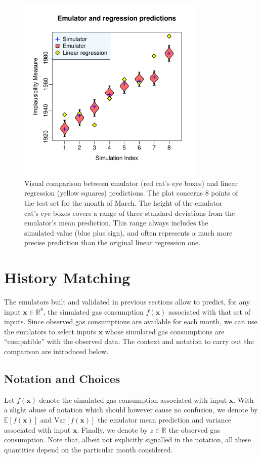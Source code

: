 \documentclass[a4paper, 12pt]{article}
\newcommand{\R}{\mathbb{R}}
\newcommand{\bd}[1]{\boldsymbol{#1}}
\newcommand{\x}{\bd x}
\newcommand{\E}{\mathbb{E}}
\newcommand{\Var}{\text{Var}}
\begin{document}
\begin{figure}
\centering
 \includegraphics[width=0.8\textwidth]{Validation_Plots/Comparison_LR/LR_Mar_82-89}
 \caption{Visual comparison between emulator (red cat's eye boxes) and linear regression (yellow squares) predictions. The plot concerns 8 points of the test set for the month of March. The height of the emulator cat's eye boxes covers a range of three standard deviations from the emulator's mean prediction. This range always includes the simulated value (blue plus sign), and often represents a much more precise prediction than the original linear regression one.}
 \label{Fig_Comparison_LR}
\end{figure}




\section{History Matching}

The emulators built and validated in previous sections allow to predict, for any input $\x \in \R^8$, the simulated gas consumption $f(\x)$ associated with that set of inputs.
Since observed gas consumptions are available for each month, we can use the emulators to select inputs $\x$ whose simulated gas consumptions are ``compatible'' with the observed data.
The context and notation to carry out the comparison are introduced below. 


\subsection{Notation and Choices}
Let $f(\x)$ denote the simulated gas consumption associated with input $\x$. With a slight abuse of notation which should however cause no confusion, we denote by $\E[f(\x)]$ and $\Var[f(\x)]$ the emulator mean prediction and variance associated with input $\x$. Finally, we denote by $z \in \R$ the observed gas consumption. Note that, albeit not explicitly signalled in the notation, all these quantities depend on the particular month considered.
\end{document}
